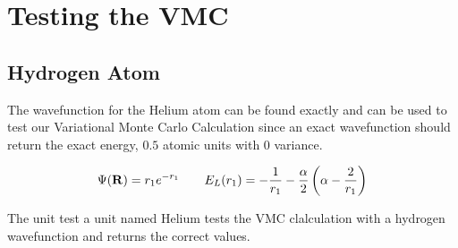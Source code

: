 \documentclass[11pt]{article}
\begin{document}
\appendix
	
	\section{Testing the VMC}
		\subsection{Hydrogen Atom}
			The wavefunction for the Helium atom can be found exactly and can be used to test our Variational Monte Carlo Calculation since an exact wavefunction should return the exact energy, \( 0.5 \) atomic units with \(0\) variance.

			\[ \Psi(\vb{R}) = r_1 e^{-r_1}  \qquad E_L(r_1) = -\frac{1}{r_1} - \frac{\alpha}{2} \left( \alpha - \frac{2}{r_1} \right) \]

			The unit test a unit named Helium tests the VMC clalculation with a hydrogen wavefunction and returns the correct values.
\end{document}
